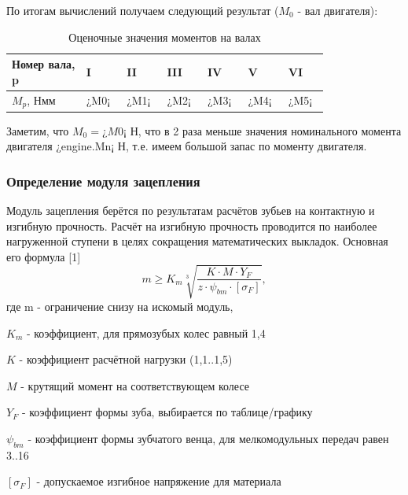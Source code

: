 \documentclass[14pt,a4paper,russian]{scrartcl}
\begin{document}
        По итогам вычислений получаем следующий результат (\( M_0 \) - вал двигателя):
        \begin{table}[h!]
            \begin{center}
                \begin{tabular}{p{0.2\linewidth}p{0.1\linewidth}p{0.1\linewidth}p{0.1\linewidth}p{0.1\linewidth}p{0.1\linewidth}p{0.1\linewidth}}
                    \hline
                    Номер вала, p & I & II & III & IV & V & VI \\
                    \hline
                    \( M_p \), Нмм & ¿M0¡ & ¿M1¡ & ¿M2¡ & ¿M3¡ & ¿M4¡ & ¿M5¡ \\
                    \hline
                \end{tabular}
                \caption{Оценочные значения моментов на валах}\label{tab:moments__shaft_estimate}
            \end{center}
        \end{table}

        Заметим, что \( M_0=¿M0¡ \) Н, что в 2 раза меньше значения номинального момента двигателя ¿engine.Mn¡ Н,
        т.е. имеем большой запас по моменту двигателя.

    \subsubsection{Определение модуля зацепления}
        Модуль зацепления берётся по результатам расчётов зубьев на контактную и
        изгибную прочность. Расчёт на изгибную прочность проводится по наиболее нагруженной ступени в целях
        сокращения математических выкладок. Основная его формула [1]
        \[ m \geq K_m\sqrt[3]{\frac{K\cdot M\cdot Y_F}{z\cdot\psi_{bm}\cdot[\sigma_F]}}, \]
        где m - ограничение снизу на искомый модуль,\par
            \( K_m \) - коэффициент, для прямозубых колес равный 1,4\par 
            \( K \) - коэффициент расчётной нагрузки (1,1..1,5)\par
            \( M \) - крутящий момент на соответствующем колесе\par
            \( Y_F \) - коэффициент формы зуба, выбирается по таблице/графику\par
            \( \psi_{bm} \) - коэффициент формы зубчатого венца, для мелкомодульных передач равен 3..16\par
            \( [\sigma_F] \) - допускаемое изгибное напряжение для материала\par
        
\end{document}
